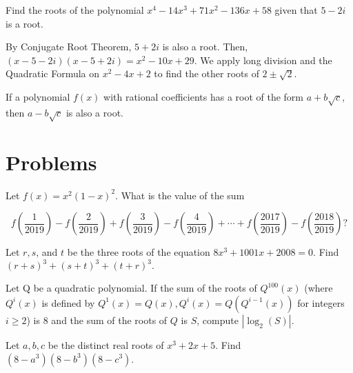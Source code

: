 \documentclass[mast]{lucky}
\begin{document}
\begin{exam}
Find the roots of the polynomial $x^4-14x^3+71x^2-136x+58$ given that $5-2i$ is a root.
\end{exam}

\begin{sol}
By Conjugate Root Theorem, $5+2i$ is also a root. Then, $(x-5-2i)(x-5+2i)=x^2-10x+29$. We apply long division and the Quadratic Formula on $x^2-4x+2$ to find the other roots of $2\pm \sqrt{2}$.
\end{sol}


\begin{theo}
If a polynomial $f(x)$ with rational coefficients has a root of the form $a+b\sqrt{c}$, then $a-b\sqrt{c}$ is also a root.
\end{theo}

\newpage
\section{Problems}



\begin{prob}[AMC 12B 2019/8]{1}

Let $f(x) = x^{2}(1-x)^{2}$. What is the value of the sum

\[f \left(\frac{1}{2019} \right)-f  \left(\frac{2}{2019} \right)+f \left(\frac{3}{2019} \right)-f \left(\frac{4}{2019} \right)+\cdots + f \left(\frac{2017}{2019} \right) - f \left(\frac{2018}{2019} \right)?\]
\end{prob}

\begin{prob}[BMT 2015]{2}
Let $r, s$, and $t$ be the three roots of the equation $8x^3 + 1001x + 2008 = 0$. Find
$(r + s)^3 + (s + t)^3 + (t + r)^3.$
\end{prob}

\begin{prob}[PuMAC 2019]{3}
Let Q be a quadratic polynomial. If the sum of the roots of $Q^{100}(x)$ (where $Q^{i}(x)$ is defined
by $Q^{1}(x) = Q(x), Q^{i}(x) = Q(Q^{i-1}(x))$ for integers $i \ge 2$) is $8$ and the sum of the roots of $Q$
is $S$, compute $|\log_{2}(S)|$.
\end{prob}

\begin{prob}{3}
Let $a,b,c$ be the distinct real roots of $x^3+2x+5$. Find $(8-a^3)(8-b^3)(8-c^3)$.
\end{prob}
\end{document}
